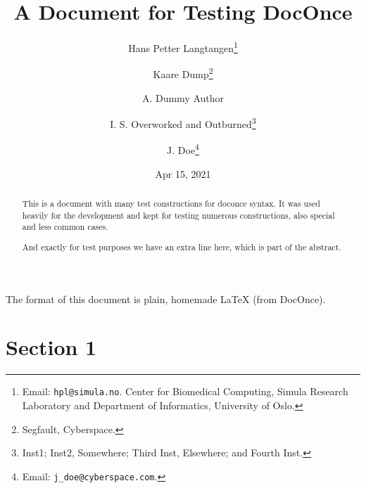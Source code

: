 \documentclass[%
oneside,                 %
final,                   %
10pt]{article}
\theoremstyle{definition}
\begin{document}

\newcommand{\exercisesection}[1]{\subsection*{#1}}








\title{A Document for Testing DocOnce}


\author{Hans Petter Langtangen\footnote{Email: \texttt{hpl@simula.no}. Center for Biomedical Computing, Simula Research Laboratory and Department of Informatics, University of Oslo.}
\and Kaare Dump\footnote{Segfault, Cyberspace.}
\and A. Dummy Author
\and I. S. Overworked and Outburned\footnote{Inst1; Inst2, Somewhere; Third Inst, Elsewhere; and Fourth Inst.}
\and J. Doe\footnote{Email: \texttt{j\_doe@cyberspace.com}.}}


\date{Apr 15, 2021}
\maketitle

\tableofcontents

\vspace{1cm} %


The format of this document is
plain, homemade {\LaTeX} (from DocOnce).

\begin{abstract}
This is a document with many test constructions for doconce syntax.
It was used heavily for the development and kept for testing
numerous constructions, also special and less common cases.

And exactly for test purposes we have an extra line here, which
is part of the abstract.

\end{abstract}

\section{Section 1}
\label{sec1}
\end{document}
